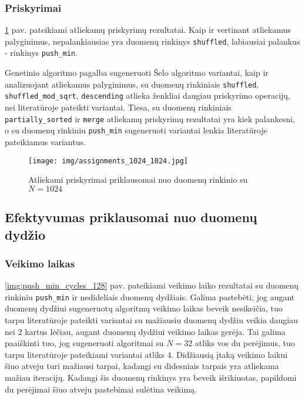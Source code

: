 \documentclass{VUMIFInfBakalaurinis}
\begin{document}
\pagebreak

\subsubsection{Priskyrimai}

\ref{img:assignments_1024_1024} pav. pateikiami atliekamų priskyrimų rezultatai.
Kaip ir vertinant atliekamus palyginimus, nepalankiausias yra duomenų rinkinys \verb|shuffled|, labiausiai palankus - rinkinys \verb|push_min|.

Genetinio algoritmo pagalba sugeneruoti Šelo algoritmo variantai, kaip ir analizuojant atliekamus palyginimus,
su duomenų rinkiniais \verb|shuffled|, \verb|shuffled_mod_sqrt|, \verb|descending| atlieka ženkliai daugiau priskyrimo operacijų, nei literatūroje pateikti variantai.
Tiesa, su duomenų rinkiniais \verb|partially_sorted| ir \verb|merge| atliekamų priskyrimų rezultatai yra kiek palankesni,
o su duomenų rinkiniu \verb|push_min|
sugeneruoti variantai lenkia literatūroje pateikiamus variantus.


\begin{figure}[H]
  \centering
  \texttt{[image: img/assignments\_1024\_1024.jpg]}
  \caption{Atliekami priskyrimai priklausomai nuo duomenų rinkinio su $N = 1024$}
  \label{img:assignments_1024_1024}
\end{figure}

\pagebreak

\subsection{Efektyvumas priklausomai nuo duomenų dydžio}

\subsubsection{Veikimo laikas}

\ref{img:push_min_cycles_128} pav. pateikiami veikimo laiko rezultatai su duomenų rinkiniu \verb|push_min| ir nedideliais duomenų dydžiais.
Galima pastebėti, jog augant duomenų dydžiui sugeneruotų algoritmų veikimo laikas beveik nesikeičia, tuo tarpu literatūroje pateikti variantai
su mažiausiu duomenų dydžiu veikia daugiau nei 2 kartus lėčiau, augant duomenų dydžiui veikimo laikas gerėja.
Tai galima paaiškinti tuo, jog sugeneruoti algoritmai su $N = 32$ atliks vos du perėjimus, tuo tarpu literatūroje pateikiami variantai atliks 4.
Didžiausią įtaką veikimo laikui šiuo atveju turi mažiausi tarpai, kadangi su didesniais tarpais yra atliekama mažiau iteracijų.
Kadangi šis duomenų rinkinys yra beveik išrikiuotas, papildomi du perėjimai šiuo atveju pastebimai sulėtina veikimą.
\end{document}
